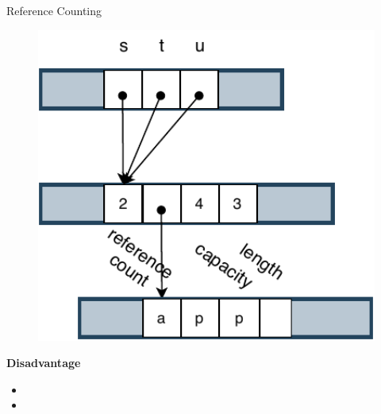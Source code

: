 \documentclass[9pt]{beamer}
\begin{document}
\begin{frame}[fragile]{Reference Counting}
\begin{minipage}{0.3\linewidth}
\begin{figure}[hp]
        \end{figure}
    \end{minipage}
    \begin{minipage}{0.3\linewidth}
        \begin{figure}[hp]
            \centering
            \begin{center}
                    \includegraphics[width=1.0\textwidth]{images/rc3.pdf}
                    \captionsetup{labelformat=empty}
            \end{center}
            
        \end{figure}
    \end{minipage}
    \vspace{0.5cm}

    \textbf{Disadvantage}
    \begin{itemize}
        \item {} 
        \item {}
    \end{itemize}


\end{frame}

\end{document}
